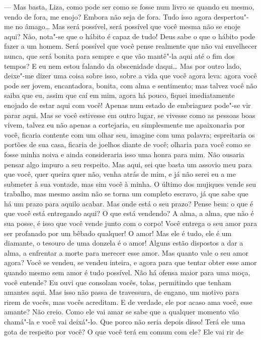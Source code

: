 --- Mas basta, Liza, como pode ser como se fosse num livro se quando eu
mesmo, vendo de fora, me enojo? Embora não seja de fora. Tudo isso
agora despertou"-me no âmago\ldots{} Mas será possível, será possível que
você mesma não se enoje aqui? Não, nota"-se que o hábito é capaz de
tudo! Deus sabe o que o hábito pode fazer a um homem. Será possível que
você pense realmente que não vai envelhecer nunca, que será bonita para
sempre e que vão mantê"-la aqui até o fim dos tempos? E eu nem estou
falando da obscenidade daqui\ldots{} Mas por outro lado, deixe"-me dizer uma
coisa sobre isso, sobre a vida que você agora leva: agora você pode ser
jovem, encantadora, bonita, com alma e sentimento; mas talvez você não
saiba que eu, assim que caí em mim, agora há pouco, fiquei
imediatamente enojado de estar aqui com você! Apenas num estado de
embriaguez pode"-se vir parar aqui. Mas se você estivesse em outro
lugar, se vivesse como as pessoas boas vivem, talvez eu não apenas a
cortejaria, eu simplesmente me apaixonaria por você, ficaria contente
com um olhar seu, imagine com uma palavra; espreitaria os portões de
sua casa, ficaria de joelhos diante de você; olharia para você como se
fosse minha noiva e ainda consideraria isso uma honra para mim. Não
ousaria pensar algo impuro a seu respeito. Mas aqui, sei que basta um
assovio meu para que você, quer queira quer não, venha atrás de mim, e
já não serei eu a me submeter à sua vontade, mas sim você à minha. O
último dos mujiques vende seu trabalho, mas mesmo assim não se torna um
completo escravo, já que sabe que há um prazo para aquilo acabar. Mas
onde está o seu prazo? Pense bem: o que é que você está entregando
aqui? O que está vendendo? A alma, a alma, que não é sua posse, é isso
que você vende junto com o corpo! Você entrega o seu amor para ser
profanado por um bêbado qualquer! O amor! Mas ele é tudo, ele é um
diamante, o tesouro de uma donzela é o amor! Alguns estão dispostos a
dar a alma, a enfrentar a morte para merecer esse amor. Mas quanto vale
o seu amor agora? Você se vendeu, se vendeu inteira, e agora para que
tentar obter esse amor quando mesmo sem amor é tudo possível. Não há
ofensa maior para uma moça, você entende? Eu ouvi que consolam vocês,
tolas, permitindo que tenham amantes aqui. Mas isso não passa de
travessura, de engano, um motivo para rirem de vocês, mas vocês
acreditam. E de verdade, ele por acaso ama você, esse amante? Não
creio. Como ele vai amar se sabe que a qualquer momento vão chamá"-la e
você vai deixá"-lo. Que porco não seria depois disso! Terá ele uma gota
de respeito por você? O que você terá em comum com ele? Ele vai rir de
